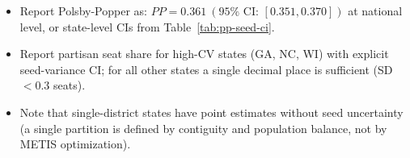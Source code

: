 \begin{itemize}
  \item Report Polsby-Popper as: $PP = 0.361\ (95\%\text{ CI: }[0.351, 0.370])$
    at national level, or state-level CIs from Table~\ref{tab:pp-seed-ci}.

  \item Report partisan seat share for high-CV states (GA, NC, WI) with
    explicit seed-variance CI; for all other states a single decimal
    place is sufficient (SD $< 0.3$ seats).

  \item Note that single-district states have point estimates without
    seed uncertainty (a single partition is defined by contiguity and
    population balance, not by METIS optimization).
\end{itemize}
